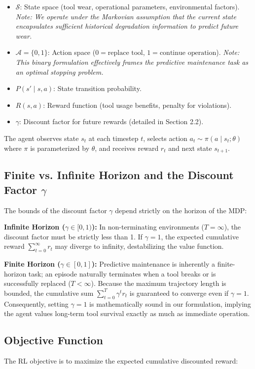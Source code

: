 \documentclass[11pt]{article}
\begin{document}
\begin{itemize}
\item $\mathcal{S}$: State space (tool wear, operational parameters, environmental factors). \textit{Note: We operate under the Markovian assumption that the current state encapsulates sufficient historical degradation information to predict future wear.}
\item $\mathcal{A} = \{0, 1\}$: Action space ($0 = \text{replace tool}$, $1 = \text{continue operation}$). \textit{Note: This binary formulation effectively frames the predictive maintenance task as an optimal stopping problem.}
\item $P(s'\mid s, a)$: State transition probability.
\item $R(s, a)$: Reward function (tool usage benefits, penalty for violations).
\item $\gamma$: Discount factor for future rewards (detailed in Section 2.2).
\end{itemize}

The agent observes state $s_t$ at each timestep $t$, selects action $a_t \sim \pi(a\mid s_t; \theta)$ where $\pi$ is parameterized by $\theta$, and receives reward $r_t$ and next state $s_{t+1}$.

\subsection{Finite vs. Infinite Horizon and the Discount Factor $\gamma$}
The bounds of the discount factor $\gamma$ depend strictly on the horizon of the MDP:

\textbf{Infinite Horizon ($\gamma \in [0, 1)$):} In non-terminating environments ($T = \infty$), the discount factor must be strictly less than 1. If $\gamma = 1$, the expected cumulative reward $\sum_{t=0}^{\infty} r_t$ may diverge to infinity, destabilizing the value function. 

\textbf{Finite Horizon ($\gamma \in [0, 1]$):} Predictive maintenance is inherently a finite-horizon task; an episode naturally terminates when a tool breaks or is successfully replaced ($T < \infty$). Because the maximum trajectory length is bounded, the cumulative sum $\sum_{t=0}^{T} \gamma^t r_t$ is guaranteed to converge even if $\gamma = 1$. Consequently, setting $\gamma = 1$ is mathematically sound in our formulation, implying the agent values long-term tool survival exactly as much as immediate operation.

\subsection{Objective Function}
The RL objective is to maximize the expected cumulative discounted reward:
\end{document}
